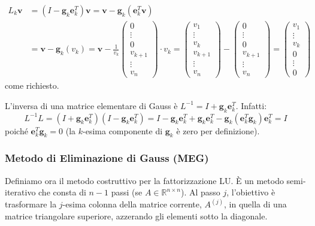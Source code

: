 \begin{align*}
    L_k \mathbf{v} &= (I - \mathbf{g}_k \mathbf{e}_k^T) \mathbf{v} = \mathbf{v} - \mathbf{g}_k (\mathbf{e}_k^T \mathbf{v}) \\
                   &= \mathbf{v} - \mathbf{g}_k (v_k) = \mathbf{v} - \frac{1}{v_k} \begin{pmatrix} 0 \\ \vdots \\ 0 \\ v_{k+1} \\ \vdots \\ v_n \end{pmatrix} \cdot v_k
                   = \begin{pmatrix} v_1 \\ \vdots \\ v_k \\ v_{k+1} \\ \vdots \\ v_n \end{pmatrix} - 
                     \begin{pmatrix} 0 \\ \vdots \\ 0 \\ v_{k+1} \\ \vdots \\ v_n \end{pmatrix}
                   = \begin{pmatrix} v_1 \\ \vdots \\ v_k \\ 0 \\ \vdots \\ 0 \end{pmatrix}
\end{align*}
come richiesto.

\begin{osservazione}
L'inversa di una matrice elementare di Gauss è $L^{-1} = I + \mathbf{g}_k \mathbf{e}_k^T$.
Infatti:
$$ L^{-1} L = (I + \mathbf{g}_k \mathbf{e}_k^T) (I - \mathbf{g}_k \mathbf{e}_k^T) = I - \mathbf{g}_k \mathbf{e}_k^T + \mathbf{g}_k \mathbf{e}_k^T - \mathbf{g}_k (\mathbf{e}_k^T \mathbf{g}_k) \mathbf{e}_k^T = I $$
poiché $\mathbf{e}_k^T \mathbf{g}_k = 0$ (la $k$-esima componente di $\mathbf{g}_k$ è zero per definizione).
\end{osservazione}

\subsubsection{Metodo di Eliminazione di Gauss (MEG)}
Definiamo ora il metodo costruttivo per la fattorizzazione LU. È un metodo semi-iterativo che consta di $n-1$ passi (se $A \in \mathbb{R}^{n \times n}$). Al passo $j$, l'obiettivo è trasformare la $j$-esima colonna della matrice corrente, $A^{(j)}$, in quella di una matrice triangolare superiore, azzerando gli elementi sotto la diagonale.

